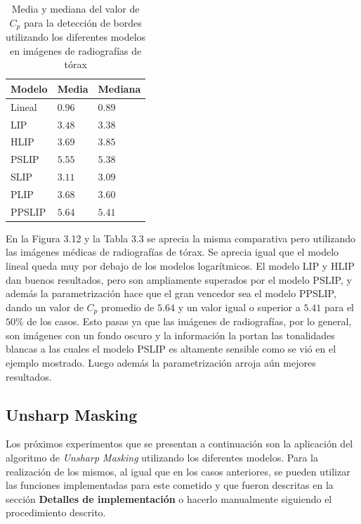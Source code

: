 \begin{table}
	\begin{center}
		\begin{tabular}{|l|l|l|}
			\hline 
			Modelo & Media & Mediana\\
			\hline
			Lineal & $0.96$ & $0.89$\\
			\hline
			LIP & $3.48$ & $3.38$\\
			\hline
			HLIP & $3.69$ & $3.85$\\
			\hline
			PSLIP & $5.55$ & $5.38$\\
			\hline
			SLIP & $3.11$ & $3.09$\\
			\hline
			PLIP & $3.68$ & $3.60$\\
			\hline
			PPSLIP & $5.64$ & $5.41$\\
			\hline
		\end{tabular}
		\caption{Media y mediana del valor de $C_p$ para la detecci\'on de bordes utilizando los diferentes modelos en im\'agenes de radiograf\'ias de t\'orax}
	\end{center}
\end{table}

En la Figura 3.12 y la Tabla 3.3 se aprecia la misma comparativa pero utilizando las im\'agenes m\'edicas de radiograf\'ias de t\'orax. Se aprecia igual que el modelo lineal queda muy por debajo de los modelos logar\'itmicos. El modelo LIP y HLIP dan buenos resultados, pero son ampliamente superados por el modelo PSLIP, y adem\'as la parametrizaci\'on hace que el gran vencedor sea el modelo PPSLIP, dando un valor de $C_p$ promedio de $5.64$ y un valor igual o superior a $5.41$ para el $50\%$  de los casos. Esto pasas ya que las im\'agenes de radiograf\'ias, por lo general, son im\'agenes con un fondo oscuro y la informaci\'on la portan las tonalidades blancas a las cuales el modelo PSLIP es altamente sensible como se vi\'o en el ejemplo mostrado. Luego adem\'as la parametrizaci\'on arroja a\'un mejores resultados. 

\subsection{Unsharp Masking}

Los pr\'oximos experimentos que se presentan a continuaci\'on son la aplicaci\'on del algoritmo de \textit{Unsharp Masking} utilizando los diferentes modelos. Para la realizaci\'on de los mismos, al igual que en los casos anteriores, se pueden utilizar las funciones implementadas para este cometido y que fueron descritas en la secci\'on \textbf{Detalles de implementaci\'on} o hacerlo manualmente siguiendo el procedimiento descrito.

